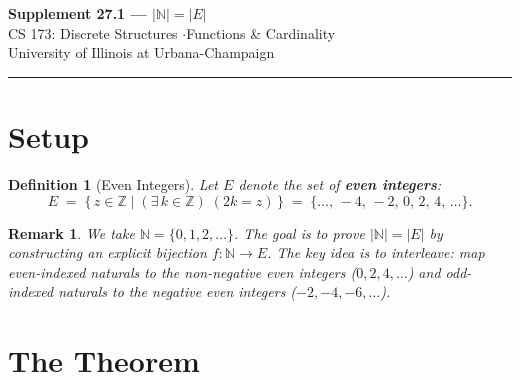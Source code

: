 \documentclass[11pt]{article}
\theoremstyle{defstyle}
\newtheorem{definition}{Definition}[section]
\theoremstyle{thmstyle}
\theoremstyle{notstyle}
\newtheorem*{remark}{Remark}
\theoremstyle{cautionstyle}
\newcommand{\Z}{\mathbb{Z}}
\newcommand{\N}{\mathbb{N}}
\begin{document}
\begin{center}
  {\Large\bfseries Supplement 27.1 --- $|\N| = |E|$}\\[4pt]
  {\normalsize CS 173: Discrete Structures \quad$\cdot$\quad Functions \& Cardinality}\\[2pt]
  {\small\color{gray} University of Illinois at Urbana-Champaign}
\end{center}
\vspace{1em}\hrule\vspace{1.5em}

\section{Setup}

\begin{defbox}
\begin{definition}[Even Integers]
Let $E$ denote the set of \textbf{even integers}:
\[
  E \;=\; \bigl\{\, z \in \Z \;\big|\; (\exists\, k \in \Z)\;(2k = z) \,\bigr\}
    \;=\; \{\dots,\, -4,\, -2,\, 0,\, 2,\, 4,\, \dots\}.
\]
\end{definition}
\end{defbox}

\begin{notebox}
\begin{remark}
We take $\N = \{0, 1, 2, \ldots\}$.  The goal is to prove $|\N| = |E|$ by
constructing an explicit bijection $f\colon \N \to E$.  The key idea is to
\emph{interleave}: map even-indexed naturals to the non-negative even integers
($0, 2, 4, \ldots$) and odd-indexed naturals to the negative even integers
($-2, -4, -6, \ldots$).
\end{remark}
\end{notebox}

\section{The Theorem}
\end{document}

